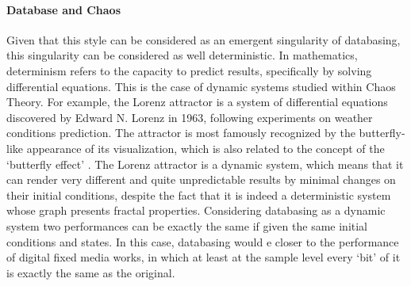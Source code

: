 \paragraph{Database and Chaos}
Given that this style can be considered as an emergent singularity of databasing, this singularity can be considered as well deterministic. In mathematics, determinism refers to the capacity to predict results, specifically by solving differential equations. This is the case of dynamic systems studied within Chaos Theory. For example, the Lorenz attractor is a system of differential equations discovered by Edward N. Lorenz in 1963, following experiments on weather conditions prediction. The attractor is most famously recognized by the butterfly-like appearance of its visualization, which is also related to the concept of the `butterfly effect' . The Lorenz attractor is a dynamic system, which means that it can render very different and quite unpredictable results by minimal changes on their initial conditions, despite the fact that it is indeed a deterministic system whose graph presents fractal properties. Considering databasing as a dynamic system two performances can be exactly the same if given the same initial conditions and states. In this case, databasing would e closer to the performance of digital fixed media works, in which at least at the sample level every `bit' of it is exactly the same as the original. 


